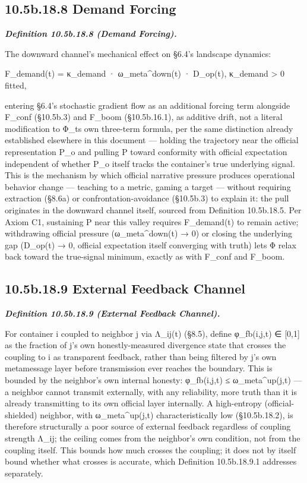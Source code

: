 \documentclass[
]{article}
\begin{document}
\hypertarget{b.18.8-demand-forcing}{%
\subsection{10.5b.18.8 Demand Forcing}\label{b.18.8-demand-forcing}}

\emph{\textbf{Definition 10.5b.18.8 (Demand Forcing).}}

The downward channel's mechanical effect on §6.4's landscape dynamics:

F\_demand(t) = κ\_demand · ω\_meta\^{}down(t) · D\_op(t), κ\_demand
\textgreater{} 0 fitted,

entering §6.4's stochastic gradient flow as an additional forcing term
alongside F\_conf (§10.5b.3) and F\_boom (§10.5b.16.1), as additive
drift, not a literal modification to Φ\_ts own three-term formula, per
the same distinction already established elsewhere in this document ---
holding the trajectory near the official representation P\_o and pulling
P toward conformity with official expectation independent of whether
P\_o itself tracks the container's true underlying signal. This is the
mechanism by which official narrative pressure produces operational
behavior change --- teaching to a metric, gaming a target --- without
requiring extraction (§8.6a) or confrontation-avoidance (§10.5b.3) to
explain it: the pull originates in the downward channel itself, sourced
from Definition 10.5b.18.5. Per Axiom C1, sustaining P near this valley
requires F\_demand(t) to remain active; withdrawing official pressure
(ω\_meta\^{}down(t) → 0) or closing the underlying gap (D\_op(t) → 0,
official expectation itself converging with truth) lets Φ relax back
toward the true-signal minimum, exactly as with F\_conf and F\_boom.

\hypertarget{b.18.9-external-feedback-channel}{%
\subsection{10.5b.18.9 External Feedback
Channel}\label{b.18.9-external-feedback-channel}}

\emph{\textbf{Definition 10.5b.18.9 (External Feedback Channel).}}

For container i coupled to neighbor j via Λ\_ij(t) (§8.5), define
φ\_fb(i,j,t) ∈ {[}0,1{]} as the fraction of j's own honestly-measured
divergence state that crosses the coupling to i as transparent feedback,
rather than being filtered by j's own metamessage layer before
transmission ever reaches the boundary. This is bounded by the
neighbor's own internal honesty: φ\_fb(i,j,t) ≤ ω\_meta\^{}up(j,t) --- a
neighbor cannot transmit externally, with any reliability, more truth
than it is already transmitting to its own official layer internally. A
high-entropy (official-shielded) neighbor, with ω\_meta\^{}up(j,t)
characteristically low (§10.5b.18.2), is therefore structurally a poor
source of external feedback regardless of coupling strength Λ\_ij; the
ceiling comes from the neighbor's own condition, not from the coupling
itself. This bounds how much crosses the coupling; it does not by itself
bound whether what crosses is accurate, which Definition 10.5b.18.9.1
addresses separately.
\end{document}
